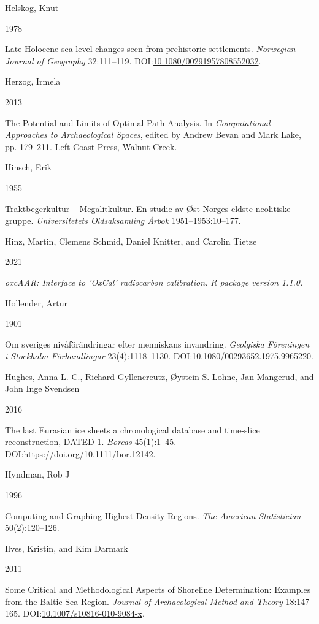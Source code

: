 \documentclass[
]{article}
\newlength{\cslhangindent}
\newlength{\csllabelwidth}
\newlength{\cslentryspacingunit} %
\newenvironment{CSLReferences}[2] %
 {%
  \setlength{\parindent}{0pt}
  \ifodd #1
  \let\oldpar\par
  \def\par{\hangindent=\cslhangindent\oldpar}
  \fi
  \setlength{\parskip}{#2\cslentryspacingunit}
 }%
 {}
\newcommand{\CSLBlock}[1]{#1\hfill\break}
\newcommand{\CSLLeftMargin}[1]{\parbox[t]{\csllabelwidth}{#1}}
\newcommand{\CSLRightInline}[1]{\parbox[t]{\linewidth - \csllabelwidth}{#1}\break}
\begin{document}
\begin{CSLReferences}{0}{0}
\leavevmode{}%
\CSLBlock{Helskog, Knut}
\CSLLeftMargin{ 1978}
\CSLRightInline{Late Holocene sea-level changes seen from prehistoric settlements. \emph{Norwegian Journal of Geography} 32:111--119. DOI:\href{https://doi.org/10.1080/00291957808552032}{10.1080/00291957808552032}.}

\leavevmode{}%
\CSLBlock{Herzog, Irmela}
\CSLLeftMargin{ 2013}
\CSLRightInline{{The Potential and Limits of Optimal Path Analysis}. In \emph{{Computational Approaches to Archaeological Spaces}}, edited by Andrew Bevan and Mark Lake, pp. 179--211. Left Coast Press, Walnut Creek.}

\leavevmode{}%
\CSLBlock{Hinsch, Erik}
\CSLLeftMargin{ 1955}
\CSLRightInline{{Traktbegerkultur -- Megalitkultur. En studie av Øst-Norges eldste neolitiske gruppe}. \emph{Universitetets Oldsaksamling Årbok} 1951--1953:10--177.}

\leavevmode{}%
\CSLBlock{Hinz, Martin, Clemens Schmid, Daniel Knitter, and Carolin Tietze}
\CSLLeftMargin{ 2021}
\CSLRightInline{\emph{oxcAAR: Interface to 'OxCal' radiocarbon calibration. R package version 1.1.0.}}

\leavevmode{}%
\CSLBlock{Hollender, Artur}
\CSLLeftMargin{ 1901}
\CSLRightInline{Om sveriges nivåförändringar efter menniskans invandring. \emph{Geolgiska Föreningen i Stockholm Förhandlingar} 23(4):1118--1130. DOI:\href{https://doi.org/10.1080/00293652.1975.9965220}{10.1080/00293652.1975.9965220}.}

\leavevmode{}%
\CSLBlock{Hughes, Anna L. C., Richard Gyllencreutz, Øystein S. Lohne, Jan Mangerud, and John Inge Svendsen}
\CSLLeftMargin{ 2016}
\CSLRightInline{The last Eurasian ice sheets {\textendash} a chronological database and time-slice reconstruction, DATED-1. \emph{Boreas} 45(1):1--45. DOI:\url{https://doi.org/10.1111/bor.12142}.}

\leavevmode{}%
\CSLBlock{Hyndman, Rob J}
\CSLLeftMargin{ 1996}
\CSLRightInline{Computing and Graphing Highest Density Regions. \emph{The American Statistician} 50(2):120--126.}

\leavevmode{}%
\CSLBlock{Ilves, Kristin, and Kim Darmark}
\CSLLeftMargin{ 2011}
\CSLRightInline{Some Critical and Methodological Aspects of Shoreline Determination: Examples from the Baltic Sea Region. \emph{Journal of Archaeological Method and Theory} 18:147--165. DOI:\href{https://doi.org/10.1007/s10816-010-9084-x}{10.1007/s10816-010-9084-x}.}


\end{CSLReferences}
\end{document}
